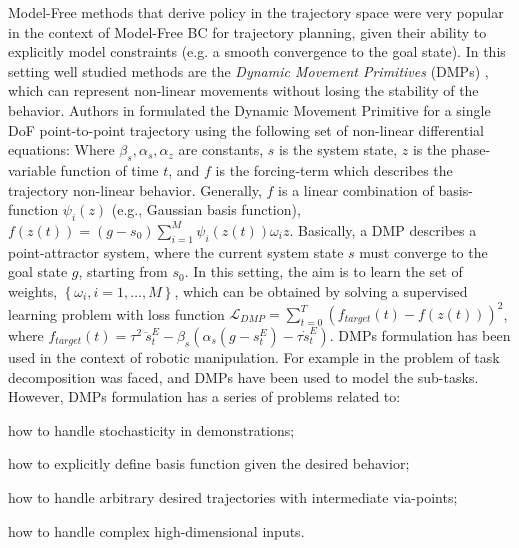Model-Free methods that derive policy in the trajectory space were very popular in the context of Model-Free BC for trajectory planning, given their ability to explicitly model constraints (e.g. a smooth convergence to the goal state). In this setting well studied methods are the \textit{Dynamic Movement Primitives} (DMPs) \cite{ijspeert2002learning,ijspeert2013dynamical}, which can represent non-linear movements without losing the stability of the behavior.
Authors in \cite{ijspeert2013dynamical} formulated the Dynamic Movement Primitive for a single DoF point-to-point trajectory using the following set of non-linear differential equations:  Where $\beta_{s}, \alpha_{s}, \alpha_{z}$ are constants, $s$ is the system state, $z$ is the phase-variable function of time $t$, and $f$ is the forcing-term which describes the trajectory non-linear behavior. Generally, $f$ is a linear combination of basis-function $\psi_{i}(z)$ (e.g., Gaussian basis function), $f(z(t)) = (g-s_{0}) \sum_{i=1}^{M}\psi_{i}(z(t))\omega_{i}z$. Basically, a DMP describes a point-attractor system, where the current system state $s$ must converge to the goal state $g$, starting from $s_{0}$. In this setting, the aim is to learn the set of weights, $\left\{\omega_{i}, i=1,\dots,M\right\}$, which can be obtained by solving a supervised learning problem with loss function $\mathcal{L}_{DMP} = \sum_{t=0}^{T}(f_{target}(t) - f(z(t)))^{2}$, where $f_{target}(t) = \tau^{2} \ \ddot{s}^{E}_{t} - \beta_{s}(\alpha_{s}(g - s^{E}_{t})-\tau \dot{s}^{E}_{t})$. DMPs formulation has been used in the context of robotic manipulation. For example in \cite{meier2011movement_primitive,caccavale2019kinesthetic,agostini2020manipulation} the problem of task decomposition was faced, and DMPs have been used to model the sub-tasks. However, DMPs formulation has a series of problems related to: \begin{enumerate*}[label=(\textbf{\alph*})]
    \item how to handle stochasticity in demonstrations;
    \item how to explicitly define basis function
    given the desired behavior;
    \item how to handle arbitrary desired trajectories
    with intermediate via-points;
    \item how to handle complex high-dimensional inputs.
\end{enumerate*}
